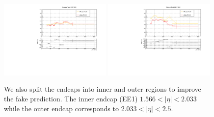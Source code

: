 \begin{figure}[!htbp]
  \centering
  \includegraphics[width=0.49\textwidth]{fig/closureTest_MCTruth_comparisonsEE1_2017_adjustrange.pdf}
  \includegraphics[width=0.49\textwidth]{fig/closureTest_MCTruth_comparisonsEE2_2017_adjustrange.pdf}
  \caption{We also split the endcaps into inner and outer regions to improve the fake prediction. The inner endcap (EE1) $1.566 < |\eta| < 2.033$ while the outer endcap corresponds to $2.033 < \lvert \eta \rvert< 2.5$.}
  \label{fig:templates_2017_etaBinnedEE}
\end{figure}


